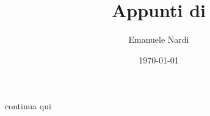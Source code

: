 \documentclass[class=article, crop=false, 12pt]{standalone}
\title{Appunti di \Java{}}
\author{Emanuele Nardi}
\date{\today}
\begin{document}
\maketitle


continua qui
\end{document}

